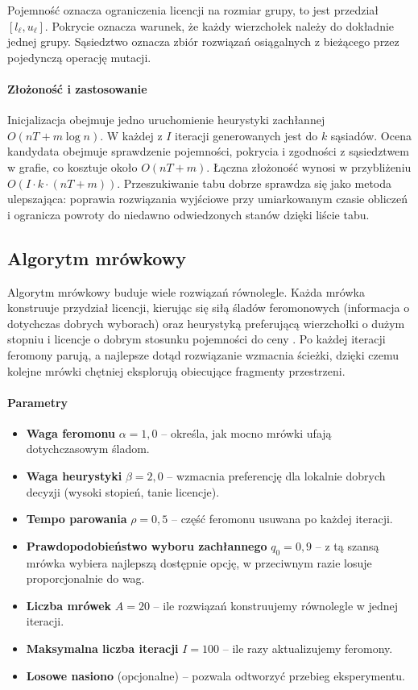 Pojemność oznacza ograniczenia licencji na rozmiar grupy, to jest przedział \([l_\ell,u_\ell]\). Pokrycie oznacza warunek, że każdy wierzchołek należy do dokładnie jednej grupy. Sąsiedztwo oznacza zbiór rozwiązań osiągalnych z bieżącego przez pojedynczą operację mutacji.

\paragraph{Złożoność i zastosowanie}
Inicjalizacja obejmuje jedno uruchomienie heurystyki zachłannej \(O(nT + m\log n)\). W każdej z \(I\) iteracji generowanych jest do \(k\) sąsiadów. Ocena kandydata obejmuje sprawdzenie pojemności, pokrycia i zgodności z sąsiedztwem w grafie, co kosztuje około \(O(nT + m)\). Łączna złożoność wynosi w przybliżeniu \(O\!\left(I \cdot k \cdot (nT + m)\right)\). Przeszukiwanie tabu dobrze sprawdza się jako metoda ulepszająca: poprawia rozwiązania wyjściowe przy umiarkowanym czasie obliczeń i ogranicza powroty do niedawno odwiedzonych stanów dzięki liście tabu.

\subsection{Algorytm mrówkowy}\label{subsec:aco}
Algorytm mrówkowy buduje wiele rozwiązań równolegle. Każda mrówka konstruuje przydział licencji, kierując się siłą śladów feromonowych (informacja o dotychczas dobrych wyborach) oraz heurystyką preferującą wierzchołki o dużym stopniu i licencje o dobrym stosunku pojemności do ceny \cite{dorigo1997}. Po każdej iteracji feromony parują, a najlepsze dotąd rozwiązanie wzmacnia ścieżki, dzięki czemu kolejne mrówki chętniej eksplorują obiecujące fragmenty przestrzeni.

\paragraph{Parametry}
\begin{itemize}
  \item \textbf{Waga feromonu} $\alpha=1,0$ -- określa, jak mocno mrówki ufają dotychczasowym śladom.
  \item \textbf{Waga heurystyki} $\beta=2,0$ -- wzmacnia preferencję dla lokalnie dobrych decyzji (wysoki stopień, tanie licencje).
  \item \textbf{Tempo parowania} $\rho=0,5$ -- część feromonu usuwana po każdej iteracji.
  \item \textbf{Prawdopodobieństwo wyboru zachłannego} $q_0=0,9$ -- z tą szansą mrówka wybiera najlepszą dostępnie opcję, w przeciwnym razie losuje proporcjonalnie do wag.
  \item \textbf{Liczba mrówek} $A=20$ -- ile rozwiązań konstruujemy równolegle w jednej iteracji.
  \item \textbf{Maksymalna liczba iteracji} $I=100$ -- ile razy aktualizujemy feromony.
  \item \textbf{Losowe nasiono} (opcjonalne) -- pozwala odtworzyć przebieg eksperymentu.
\end{itemize}


